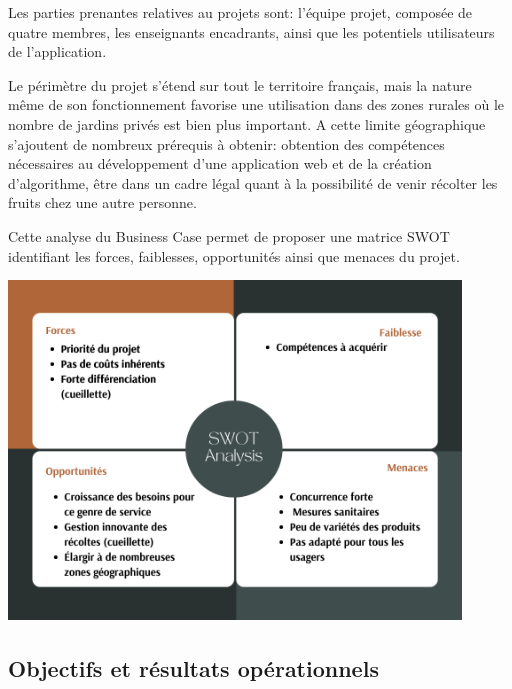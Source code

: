 \documentclass{article}
\begin{document}
\vspace{4mm}

Les parties prenantes relatives au projets sont: l'équipe projet, composée de quatre membres, les enseignants encadrants, ainsi que les potentiels utilisateurs de l'application.

Le périmètre du projet s'étend sur tout le territoire français, mais la nature même de son fonctionnement favorise une utilisation dans des zones rurales où le nombre de jardins privés est bien plus important.
A cette limite géographique s'ajoutent de nombreux prérequis à obtenir: obtention des compétences nécessaires au développement d'une application web et de la création d'algorithme, être dans un cadre légal quant à la possibilité de venir récolter les fruits chez une autre personne.

\vspace{4mm}
 
Cette analyse du Business Case permet de proposer une matrice SWOT identifiant les forces, faiblesses, opportunités ainsi que menaces du projet.

\vspace{2mm}             
  
\begin{centering}
\includegraphics[width = 12cm, height = 9 cm]{SWOTF.png}
\end{centering}

\maketitle
\subsection{Objectifs et résultats opérationnels}
\end{document}
